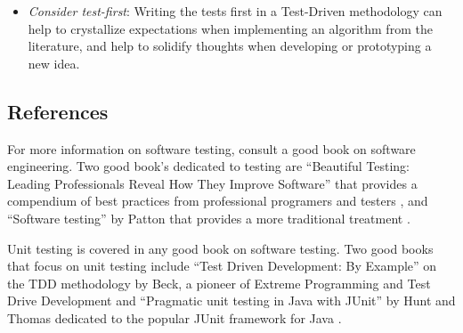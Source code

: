 \begin{itemize}
	\item \emph{Consider test-first}: Writing the tests first in a Test-Driven methodology can help to crystallize expectations when implementing an algorithm from the literature, and help to solidify thoughts when developing or prototyping a new idea.
\end{itemize}

% 
% 
\subsection{References}
For more information on software testing, consult a good book on software engineering. Two good book's dedicated to testing are ``Beautiful Testing: Leading Professionals Reveal How They Improve Software'' that provides a compendium of best practices from professional programers and testers \cite{Goucher2009}, and ``Software testing'' by Patton that provides a more traditional treatment \cite{Patton2005}.

Unit testing is covered in any good book on software testing.
Two good books that focus on unit testing include ``Test Driven Development: By Example'' on the TDD methodology by Beck, a pioneer of Extreme Programming and Test Drive Development \cite{Beck2002} and ``Pragmatic unit testing in Java with JUnit'' by Hunt and Thomas dedicated to the popular JUnit framework for Java \cite{Hunt2003}.


